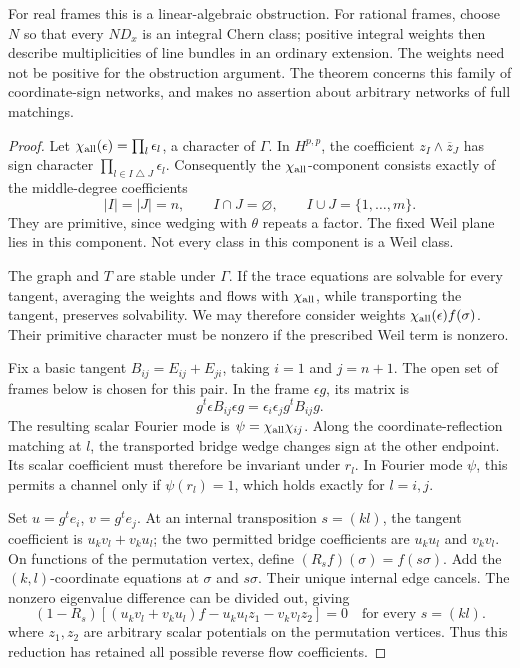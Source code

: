 For real frames this is a linear-algebraic obstruction.  For rational
frames, choose \(N\) so that every \(ND_x\) is an integral Chern class;
positive integral weights then describe multiplicities of line bundles
in an ordinary extension.  The weights need not be positive for the
obstruction argument.  The theorem concerns this family of coordinate-sign networks,
and makes no assertion about arbitrary networks of full matchings.

\begin{proof}
Let \(\chi_{\rm all}(\epsilon)=\prod_l\epsilon_l\), a character of
\(\Gamma\).  In \(H^{p,p}\), the coefficient
\(z_I\wedge\overline z_J\) has sign character
\(\prod_{l\in I\mathbin{\triangle}J}\epsilon_l\).
Consequently the \(\chi_{\rm all}\)-component consists exactly of
the middle-degree coefficients
\[
 |I|=|J|=n,\qquad I\cap J=\varnothing,\qquad I\cup J=\{1,\ldots,m\}.
\]
They are primitive, since wedging with \(\theta\) repeats a factor.
The fixed Weil plane lies in this component.  Not every class in
this component is a Weil class.

The graph and \(T\) are stable under \(\Gamma\).  If the trace equations
are solvable for every tangent, averaging the weights and flows with
\(\chi_{\rm all}\), while transporting the tangent, preserves
solvability.  We may therefore consider weights
\(\chi_{\rm all}(\epsilon)f(\sigma)\).  Their primitive character must
be nonzero if the prescribed Weil term is nonzero.

Fix a basic tangent
\(B_{ij}=E_{ij}+E_{ji}\), taking \(i=1\) and \(j=n+1\).
The open set of frames below is chosen for this pair.
In the frame \(\epsilon g\), its matrix is
\[
 g^t\epsilon B_{ij}\epsilon g
   =\epsilon_i\epsilon_jg^tB_{ij}g.
\]
The resulting scalar Fourier mode is
\(\psi=\chi_{\rm all}\chi_{ij}\).
Along the coordinate-reflection matching at \(l\), the transported
bridge wedge changes sign at the other endpoint.  Its scalar
coefficient must therefore be invariant under \(r_l\).
In Fourier mode \(\psi\), this permits a channel only if
\(\psi(r_l)=1\), which holds exactly for \(l=i,j\).

Set \(u=g^te_i\), \(v=g^te_j\).  At an internal transposition
\(s=(kl)\), the tangent coefficient is
\(u_kv_l+v_ku_l\); the two permitted bridge coefficients are
\(u_ku_l\) and \(v_kv_l\).  On functions of the permutation vertex,
define \((R_s f)(\sigma)=f(s\sigma)\).  Add the \((k,l)\)-coordinate equations
at \(\sigma\) and \(s\sigma\).  Their unique internal edge cancels.
The nonzero eigenvalue difference can be divided out, giving
\begin{equation}
 (1-R_s)
 \left[(u_kv_l+v_ku_l)f-u_ku_l z_1-v_kv_l z_2\right]=0
 \quad\text{for every }s=(kl).
 \label{eq:sign-cube-reduction}
\end{equation}
where \(z_1,z_2\) are arbitrary scalar potentials on the permutation
vertices.  Thus this reduction has retained all possible reverse
flow coefficients.


\end{proof}
